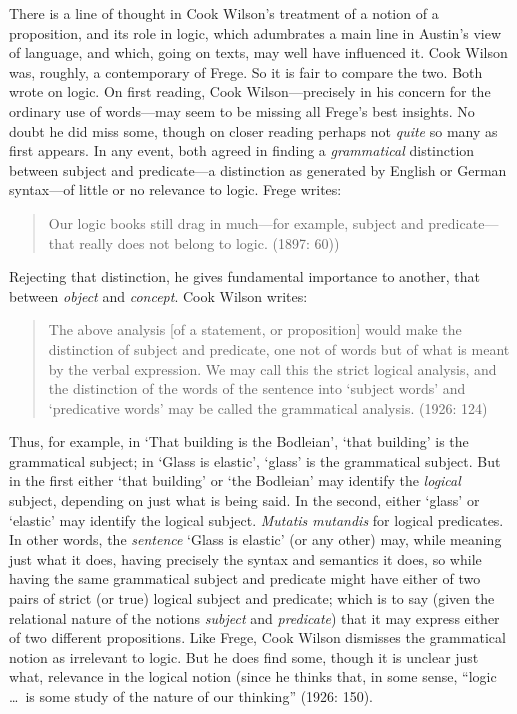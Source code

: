 There is a line of thought in Cook Wilson’s treatment of a notion of a proposition, and its role in logic, which adumbrates a main line in Austin’s view of language, and which, going on texts, may well have influenced it. Cook Wilson was, roughly, a contemporary of Frege. So it is fair to compare the two. Both wrote on logic. On first reading, Cook Wilson---precisely in his concern for the ordinary use of words---may seem to be missing all Frege’s best insights. No doubt he did miss some, though on closer reading perhaps not \emph{quite} so many as first appears. In any event, both agreed in finding a \emph{grammatical} distinction between subject and predicate---a distinction as generated by English or German syntax---of little or no relevance to logic. Frege writes:
\begin{quote}
	Our logic books still drag in much—for example, subject and predicate—that really does not belong to logic. (1897: 60))
\end{quote}
Rejecting that distinction, he gives fundamental importance to another, that between \emph{object} and \emph{concept}. Cook Wilson writes:
\begin{quote}
	The above analysis [of a statement, or proposition] would make the distinction of subject and predicate, one not of words but of what is meant by the verbal expression. We may call this the strict logical analysis, and the distinction of the words of the sentence into `subject words' and `predicative words' may be called the grammatical analysis. (1926: 124)
\end{quote}
Thus, for example, in `That building is the Bodleian', `that building' is the grammatical subject; in `Glass is elastic', `glass' is the grammatical subject. But in the first either `that building' or `the Bodleian' may identify the \emph{logical} subject, depending on just what is being said. In the second, either `glass' or `elastic' may identify the logical subject. \emph{Mutatis mutandis} for logical predicates. In other words, the \emph{sentence} `Glass is elastic' (or any other) may, while meaning just what it does, having precisely the syntax and semantics it does, so while having the same grammatical subject and predicate might have either of two pairs of strict (or true) logical subject and predicate; which is to say (given the relational nature of the notions \emph{subject} and \emph{predicate}) that it may express either of two different propositions. Like Frege, Cook Wilson dismisses the grammatical notion as irrelevant to logic. But he does find some, though it is unclear just what, relevance in the logical notion (since he thinks that, in some sense, ``logic \ldots\ is some study of the nature of our thinking'' (1926: 150).


